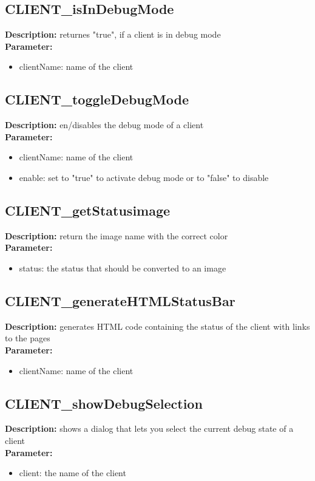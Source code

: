 \subsection{CLIENT\_isInDebugMode}
\textbf{Description:} returnes "true", if a client is in debug mode\\
\textbf{Parameter:}
\begin{itemize}
\item clientName: name of the client
\end{itemize}

\subsection{CLIENT\_toggleDebugMode}
\textbf{Description:} en/disables the debug mode of a client\\
\textbf{Parameter:}
\begin{itemize}
\item clientName: name of the client
\item enable: set to "true" to activate debug mode or to "false" to disable
\end{itemize}

\subsection{CLIENT\_getStatusimage}
\textbf{Description:} return the image name with the correct color\\
\textbf{Parameter:}
\begin{itemize}
\item status: the status that should be converted to an image
\end{itemize}

\subsection{CLIENT\_generateHTMLStatusBar}
\textbf{Description:} generates HTML code containing the status of the client with links to the pages\\
\textbf{Parameter:}
\begin{itemize}
\item clientName: name of the client
\end{itemize}

\subsection{CLIENT\_showDebugSelection}
\textbf{Description:} shows a dialog that lets you select the current debug state of a client\\
\textbf{Parameter:}
\begin{itemize}
\item client: the name of the client
\end{itemize}

